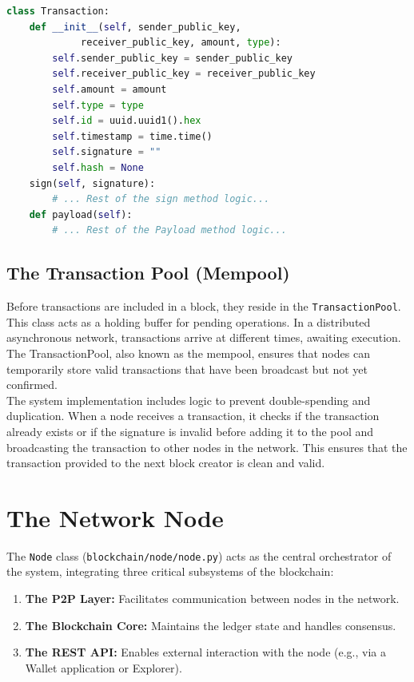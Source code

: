 \begin{lstlisting}[language=Python, caption=Transaction class code snippet, label=lst:transaction_class]
class Transaction:
    def __init__(self, sender_public_key,
             receiver_public_key, amount, type):
        self.sender_public_key = sender_public_key
        self.receiver_public_key = receiver_public_key
        self.amount = amount
        self.type = type
        self.id = uuid.uuid1().hex
        self.timestamp = time.time()
        self.signature = ""
        self.hash = None
    sign(self, signature):
        # ... Rest of the sign method logic...
    def payload(self):
        # ... Rest of the Payload method logic...
\end{lstlisting}

\subsection{The Transaction Pool (Mempool)}
Before transactions are included in a block, they reside in the \texttt{TransactionPool}. This class acts as a holding buffer for pending operations. In a distributed asynchronous network, transactions arrive at different times, awaiting execution. The TransactionPool, also known as the mempool, ensures that nodes can temporarily store valid transactions that have been broadcast but not yet confirmed.\\The system implementation includes logic to prevent double-spending and duplication. When a node receives a transaction, it checks if the transaction already exists or if the signature is invalid before adding it to the pool and broadcasting the transaction to other nodes in the network. This ensures that the transaction provided to the next block creator is clean and valid.

\section{The Network Node} \label{ch4_node_impl}

The \texttt{Node} class (\texttt{blockchain/node/node.py}) acts as the central orchestrator of the system, integrating three critical subsystems of the blockchain:
\begin{enumerate}
    \item \textbf{The P2P Layer:} Facilitates communication between nodes in the network.
    \item \textbf{The Blockchain Core:} Maintains the ledger state and handles consensus.
    \item \textbf{The REST API:} Enables external interaction with the node (e.g., via a Wallet application or Explorer).
\end{enumerate}

